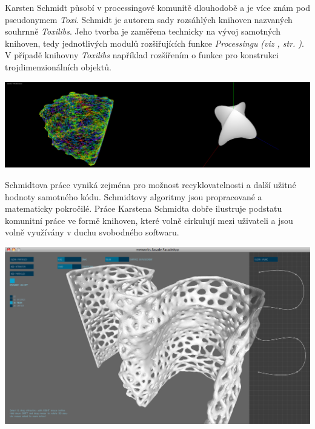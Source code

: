 \documentclass[10pt,twoside=true,open=right,cleardoublepage=empty,chapterprefix=true]{scrbook}
\newcommand{\odkaz}[1]{\textit{(viz \nameref{#1}, str. \pageref*{#1})}}
\newcommand{\lnb}{\linebreak}
\begin{document}
Karsten Schmidt působí v processingové komunitě dlouhodobě a je více znám pod pseudonymem {\em Toxi}. Schmidt je autorem sady rozsáhlých knihoven nazvaných souhrnně {\em Toxilibs}.  Jeho tvorba je zaměřena technicky na vývoj samotných knihoven, tedy jednotlivých modulů rozšiřujících funkce {\em Processingu} \odkaz{Knihovny}. V případě knihovny {\em Toxilibs} například rozšířením o funkce pro konstrukci trojdimenzionálních objektů.


\begin{center}
\includegraphics[width = 0.5\textwidth]{imgs/laplacian.png}\includegraphics[width = 0.5\textwidth]{imgs/smooth.png}


\end{center}

Schmidtova práce vyniká zejména pro možnost recyklovatelnosti a další užitné hodnoty samotného kódu. Schmidtovy algoritmy jsou propracované a matematicky pokročilé. Práce Karstena Schmidta dobře ilustruje podstatu komunitní práce ve formě knihoven, které volně cirkulují mezi uživateli \lnb a jsou volně využívány v duchu svobodného softwaru. 






\begin{center}
\includegraphics[width = 1\textwidth]{imgs/facade-7.png}

\end{center}
\end{document}

